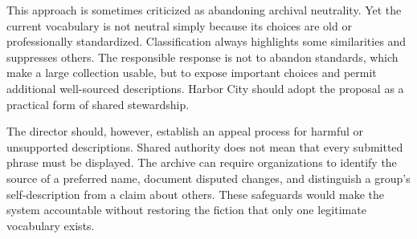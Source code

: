 This approach is sometimes criticized as abandoning archival neutrality. Yet the current vocabulary is not neutral simply because its choices are old or professionally standardized. Classification always highlights some similarities and suppresses others. The responsible response is not to abandon standards, which make a large collection usable, but to expose important choices and permit additional well-sourced descriptions. Harbor City should adopt the proposal as a practical form of shared stewardship.

The director should, however, establish an appeal process for harmful or unsupported descriptions. Shared authority does not mean that every submitted phrase must be displayed. The archive can require organizations to identify the source of a preferred name, document disputed changes, and distinguish a group's self-description from a claim about others. These safeguards would make the system accountable without restoring the fiction that only one legitimate vocabulary exists.

